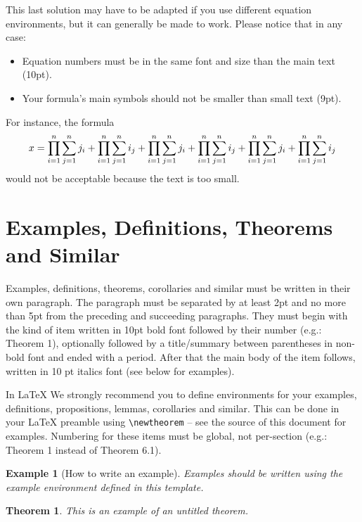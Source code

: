 \documentclass{article}
\newtheorem{example}{Example}
\newtheorem{theorem}{Theorem}
\begin{document}
This last solution may have to be adapted if you use different equation environments, but it can generally be made to work. Please notice that in any case:

\begin{itemize}
    \item Equation numbers must be in the same font and size than the main text (10pt).
    \item Your formula's main symbols should not be smaller than {\small small} text (9pt).
\end{itemize}

For instance, the formula
%
\begin{equation}
    \resizebox{.91\linewidth}{!}{$
    \displaystyle
    x = \prod_{i=1}^n \sum_{j=1}^n j_i + \prod_{i=1}^n \sum_{j=1}^n i_j + \prod_{i=1}^n \sum_{j=1}^n j_i + \prod_{i=1}^n \sum_{j=1}^n i_j + \prod_{i=1}^n \sum_{j=1}^n j_i + \prod_{i=1}^n \sum_{j=1}^n i_j
$}
\end{equation}
%
would not be acceptable because the text is too small.

\section{Examples, Definitions, Theorems and Similar}

Examples, definitions, theorems, corollaries and similar must be written in their own paragraph. The paragraph must be separated by at least 2pt and no more than 5pt from the preceding and succeeding paragraphs. They must begin with the kind of item written in 10pt bold font followed by their number (e.g.: Theorem 1), optionally followed by a title/summary between parentheses in non-bold font and ended with a period. After that the main body of the item follows, written in 10 pt italics font (see below for examples).

In \LaTeX{} We strongly recommend you to define environments for your examples, definitions, propositions, lemmas, corollaries and similar. This can be done in your \LaTeX{} preamble using \texttt{\textbackslash{newtheorem}} -- see the source of this document for examples. Numbering for these items must be global, not per-section (e.g.: Theorem 1 instead of Theorem 6.1).

\begin{example}[How to write an example]
Examples should be written using the example environment defined in this template.
\end{example}

\begin{theorem}
This is an example of an untitled theorem.
\end{theorem}
\end{document}
